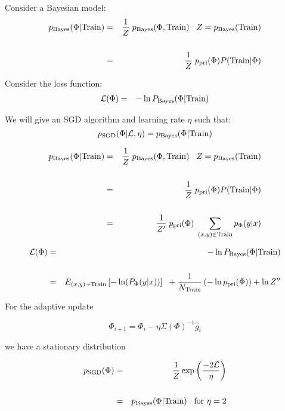 {

Consider a Bayesian model:
{\huge
\begin{eqnarray*}
p_{\mathrm{Bayes}}(\Phi|\mathrm{Train}) & = & \frac{1}{Z}\;p_{\mathrm{Bayes}}(\Phi,\mathrm{Train})\;\;\;Z = p_\mathrm{Bayes}(\mathrm{Train}) \\
\\
 & = & \frac{1}{Z}\; p_{\mathrm{pri}}(\Phi)P(\mathrm{Train}|\Phi)
 \end{eqnarray*}
}

Consider the loss function:
{\huge
\begin{eqnarray*}
{\cal L}(\Phi) & = & -\ln P_\mathrm{Bayes}(\Phi|\mathrm{Train})
\end{eqnarray*}
}

We will give an SGD algorithm and learning rate $\eta$ such that:
{\huge
$$p_\mathrm{SGD}(\Phi|{\cal L},\eta) = p_\mathrm{Bayes}(\Phi|\mathrm{Train})$$
}


{\huge
\begin{eqnarray*}
p_{\mathrm{Bayes}}(\Phi|\mathrm{Train}) & = & \frac{1}{Z}\;p_{\mathrm{Bayes}}(\Phi,\mathrm{Train})\;\;\;Z = p_\mathrm{Bayes}(\mathrm{Train}) \\
\\
 & = & \frac{1}{Z}\; p_{\mathrm{pri}}(\Phi)P(\mathrm{Train}|\Phi) \\
 \\
 & = & \frac{1}{Z'}\; p_{\mathrm{pri}}(\Phi)\;\sum_{(x,y) \in \mathrm{Train}} p_\Phi(y|x)
 \end{eqnarray*}
}

\vfill

{\huge
\begin{eqnarray*}
{\cal L}(\Phi) & = & -\ln P_\mathrm{Bayes}(\Phi|\mathrm{Train}) \\
\\
& = & E_{(x,y) \sim \mathrm{Train}}\left[-\ln(P_\Phi(y|x))\right] \;\;+ \frac{1}{N_{\mathrm{Train}}}\left(-\ln p_{\mathrm{pri}}(\Phi)\right) + \ln Z''
\end{eqnarray*}
}


For the adaptive update

\vfill
$$\Phi_{i+1} = \Phi_{i} - \eta \Sigma(\Phi)^{-1} \hat{g}_i$$

\vfill
we have a stationary distribution

\vfill
\begin{eqnarray*}
p_\mathrm{SGD}(\Phi) & = & \frac{1}{Z} \exp\left(\frac{-2{\cal L}}{\eta}\right) \\
\\
& = & p_\mathrm{Bayes}(\Phi|\mathrm{Train})\;\;\;\mbox{for $\eta = 2$}
\end{eqnarray*}

}
